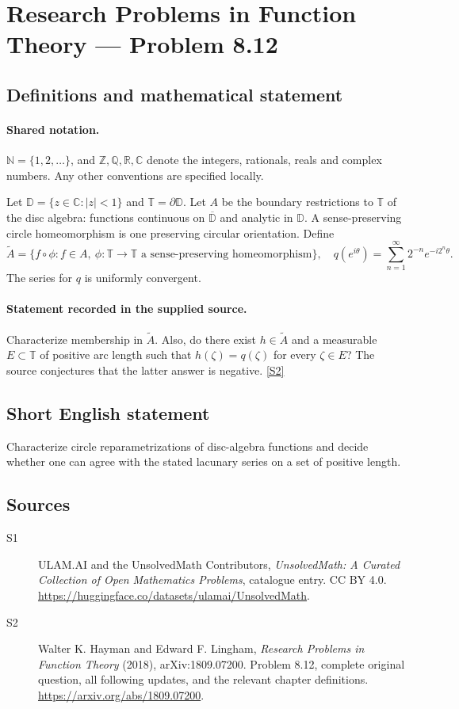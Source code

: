 \documentclass[11pt]{book}
\newcommand{\sref}[2]{\hyperlink{source:#1:#2}{[S#2]}}
\begin{document}
\section{Research Problems in Function Theory — Problem 8.12}\label{statement}

\subsection{Definitions and mathematical statement}

\paragraph{Shared notation.}$\mathbb N=\{1,2,\ldots\}$, and $\mathbb Z,\mathbb Q,\mathbb R,\mathbb C$ denote the integers, rationals, reals and complex numbers. Any other conventions are specified locally.


Let $\mathbb D=\{z\in\mathbb C:|z|<1\}$ and $\mathbb T=\partial\mathbb D$. Let $A$ be the boundary restrictions to $\mathbb T$ of the disc algebra: functions continuous on $\overline{\mathbb D}$ and analytic in $\mathbb D$. A sense-preserving circle homeomorphism is one preserving circular orientation. Define \[\widetilde A=\{f\circ\phi:f\in A,\ \phi:\mathbb T\to\mathbb T\text{ a sense-preserving homeomorphism}\},\quad q(e^{i\theta})=\sum_{n=1}^{\infty}2^{-n}e^{-i2^n\theta}.\] The series for $q$ is uniformly convergent.
\paragraph{Statement recorded in the supplied source.}
Characterize membership in $\widetilde A$. Also, do there exist $h\in\widetilde A$ and a measurable $E\subset\mathbb T$ of positive arc length such that $h(\zeta)=q(\zeta)$ for every $\zeta\in E$? The source conjectures that the latter answer is negative. \sref{statement}{2}
\subsection{Short English statement}
Characterize circle reparametrizations of disc-algebra functions and decide whether one can agree with the stated lacunary series on a set of positive length.
\subsection{Sources}
\begin{description}
\item[\hypertarget{source:statement:1}{S1}] ULAM.AI and the UnsolvedMath Contributors, \emph{UnsolvedMath: A Curated Collection of Open Mathematics Problems}, catalogue entry. CC BY 4.0. \url{https://huggingface.co/datasets/ulamai/UnsolvedMath}.
\item[\hypertarget{source:statement:2}{S2}] Walter K. Hayman and Edward F. Lingham, \emph{Research Problems in Function Theory} (2018), arXiv:1809.07200. Problem 8.12, complete original question, all following updates, and the relevant chapter definitions. \url{https://arxiv.org/abs/1809.07200}.
\end{description}
\label{end:statement}
\end{document}
